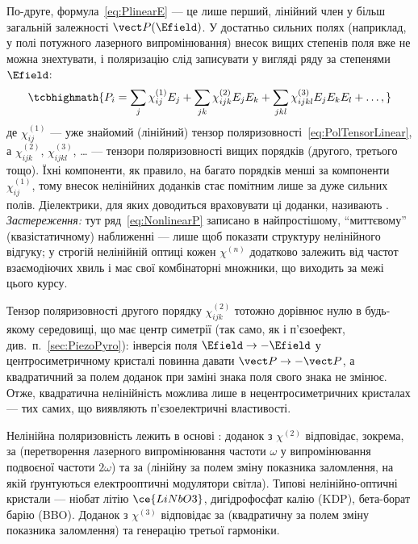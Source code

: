 По-друге, формула~\eqref{eq:PlinearE} --- це лише перший, лінійний член у більш загальній залежності $\vect P(\Efield)$. У достатньо сильних полях
(наприклад, у полі потужного лазерного випромінювання) внесок вищих степенів поля вже не можна знехтувати, і поляризацію слід записувати у вигляді
ряду за степенями $\Efield$:
\begin{equation}\label{eq:NonlinearP}
	\tcbhighmath{
		P_i = \sum_j \chi^{(1)}_{ij} E_j + \sum_{jk} \chi^{(2)}_{ijk} E_j E_k + \sum_{jkl} \chi^{(3)}_{ijkl} E_j E_k E_l + \ldots,
	}
\end{equation}
де $\chi^{(1)}_{ij}$ --- уже знайомий (лінійний) тензор поляризовності~\eqref{eq:PolTensorLinear}, а $\chi^{(2)}_{ijk}$, $\chi^{(3)}_{ijkl}$, \dots
--- тензори поляризовності вищих порядків (другого, третього тощо). Їхні компоненти, як правило, на багато порядків менші за компоненти
$\chi^{(1)}_{ij}$, тому внесок нелінійних доданків стає помітним лише за дуже сильних полів. Діелектрики, для яких доводиться враховувати ці
доданки, називають . \textit{Застереження:} тут ряд~\eqref{eq:NonlinearP} записано в найпростішому, \enquote{миттєвому}
(квазістатичному) наближенні --- лише щоб показати структуру нелінійного відгуку; у строгій нелінійній оптиці кожен $\chi^{(n)}$ додатково залежить
від частот взаємодіючих хвиль і має свої комбінаторні множники, що виходить за межі цього курсу.

\begin{Attention}
	Тензор поляризовності другого порядку $\chi^{(2)}_{ijk}$ тотожно дорівнює нулю в будь-якому середовищі, що має центр симетрії (так само, як і
	п'єзоефект, див.~п.~\ref{sec:PiezoPyro}): інверсія поля $\Efield \to -\Efield$ у центросиметричному кристалі повинна давати $\vect P \to -\vect
	P$, а квадратичний за полем доданок при заміні знака поля свого знака не змінює. Отже, квадратична нелінійність можлива лише в
	нецентросиметричних кристалах --- тих самих, що виявляють п'єзоелектричні властивості.
\end{Attention}

Нелінійна поляризовність лежить в основі : доданок з $\chi^{(2)}$ відповідає, зокрема, за  (перетворення лазерного випромінювання частоти $\omega$ у випромінювання подвоєної частоти $2\omega$) та за 
(лінійну за полем зміну показника заломлення, на якій ґрунтуються електрооптичні модулятори світла). Типові нелінійно-оптичні кристали --- ніобат
літію $\ce{LiNbO3}$, дигідрофосфат калію (KDP), бета-борат барію (BBO). Доданок з $\chi^{(3)}$ відповідає за  (квадратичну за
полем зміну показника заломлення) та генерацію третьої гармоніки.

